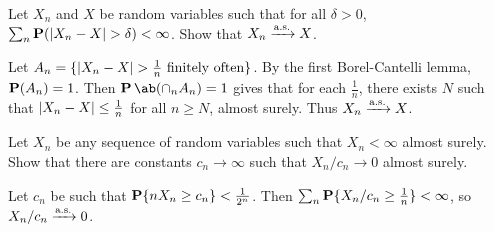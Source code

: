 \documentclass[12pt]{article}
\begin{document}
\begin{problem*}
    Let $X_n$ and $X$ be random variables such that for all $\delta > 0$,
    $\sum_n \P(\abs{X_n - X} > \delta) < \infty$.
    Show that $X_n \asto X$.
\end{problem*}
\begin{solution}
    Let $A_n = \set{\abs{X_n - X} > \frac1n \text{ finitely often}}$.
    By the first Borel-Cantelli lemma, $\P(A_n) = 1$.
    Then $\P\ab(\cap_n A_n) = 1$ gives that for each $\frac1n$, there exists
    $N$ such that $\abs{X_n - X} \le \frac1n$ for all $n \ge N$,
    almost surely.
    Thus $X_n \asto X$.
\end{solution}

\begin{problem*}
    Let $X_n$ be any sequence of random variables such that $X_n < \infty$
    almost surely.
    Show that there are constants $c_n \to \infty$ such that
    $X_n/c_n \to 0$ almost surely.
\end{problem*}
\begin{solution}
    Let $c_n$ be such that $\P\set{nX_n \ge c_n} < \frac1{2^n}$.
    Then $\sum_n \P\set{X_n/c_n \ge \frac1n} < \infty$,
    so $X_n/c_n \asto 0$.
\end{solution}
\end{document}
